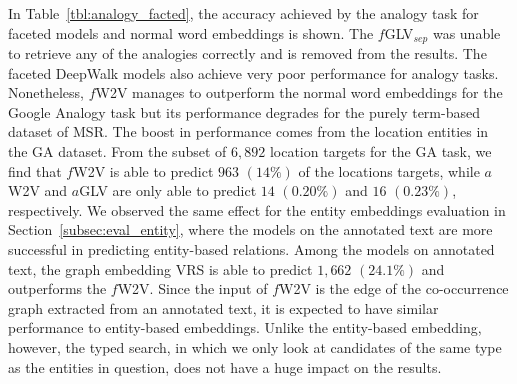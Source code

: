 In Table~\ref{tbl:analogy_facted}, the accuracy achieved by the analogy task for faceted models and normal word embeddings is shown. The $f$GLV$_{sep}$ was unable to retrieve any of the analogies correctly and is removed from the results. The faceted DeepWalk models also achieve very poor performance for analogy tasks. Nonetheless, $f$W2V manages to outperform the normal word embeddings for the Google Analogy task but its performance degrades for the purely term-based dataset of MSR. The boost in performance comes from the location entities in the GA dataset. From the subset of $6,892$ location targets for the GA task, we find that $f$W2V is able to predict $963$ $(14\%)$ of the locations targets, while $a$W2V and $a$GLV are only able to predict $14$ $(0.20\%)$ and $16$ $(0.23\%)$, respectively. We observed the same effect for the entity embeddings evaluation in Section~\ref{subsec:eval_entity}, where the models on the annotated text are more successful in predicting entity-based relations. Among the models on annotated text, the graph embedding VRS is able to predict $1,662$ $(24.1\%)$ and outperforms the $f$W2V. Since the input of $f$W2V is the edge of the co-occurrence graph extracted from an annotated text, it is expected to have similar performance to entity-based embeddings. Unlike the entity-based embedding, however, the typed search, in which we only look at candidates of the same type as the entities in question, does not have a huge impact on the results. \\

